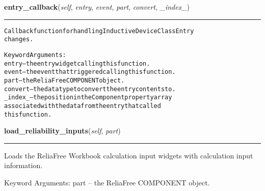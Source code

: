     \label{reliafree:resistors:resistor:Resistor:entry_callback}

    \vspace{0.5ex}

\hspace{.8\funcindent}\begin{boxedminipage}{\funcwidth}

    \raggedright \textbf{entry\_callback}(\textit{self}, \textit{entry}, \textit{event}, \textit{part}, \textit{convert}, \textit{\_index\_})

    \vspace{-1.5ex}

    \rule{\textwidth}{0.5\fboxrule}
\setlength{\parskip}{2ex}
\begin{alltt}
Callback function for handling Inductive Device Class Entry
changes.

Keyword Arguments:
  entry -- the entry widget calling this function.
  event -- the event that triggered calling this function.
   part -- the ReliaFree COMPONENT object.
convert -- the data type to convert the entry contents to.
\_index\_ -- the position in the Component property array
           associated with the data from the entry that called
           this function.
\end{alltt}

\setlength{\parskip}{1ex}
    \end{boxedminipage}

    \label{reliafree:resistors:resistor:Resistor:load_reliability_inputs}

    \vspace{0.5ex}

\hspace{.8\funcindent}\begin{boxedminipage}{\funcwidth}

    \raggedright \textbf{load\_reliability\_inputs}(\textit{self}, \textit{part})

    \vspace{-1.5ex}

    \rule{\textwidth}{0.5\fboxrule}
\setlength{\parskip}{2ex}
    Loads the ReliaFree Workbook calculation input widgets with calculation
    input information.

    Keyword Arguments: part -- the ReliaFree COMPONENT object.

\setlength{\parskip}{1ex}
    \end{boxedminipage}

